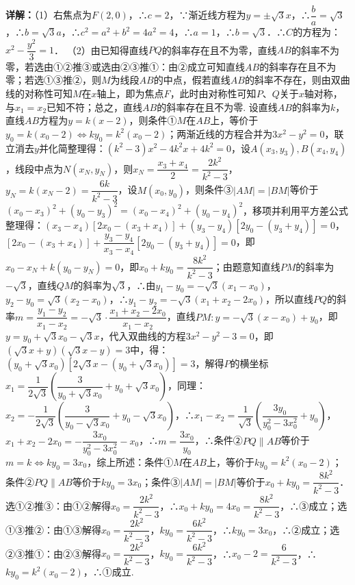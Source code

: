 \begin{question}[points=12]
\begin{solution}
\textbf{详解：}（1）右焦点为$F(2,0)$，∴$c=2$，∵渐近线方程为$y=\pm\sqrt{3}x$，∴$\dfrac{b}{a}=\sqrt{3}$，∴$b=\sqrt{3}a$，∴$c^2=a^2+b^2=4a^2=4$，∴$a=1$，∴$b=\sqrt{3}$．∴$C$的方程为：$x^2-\dfrac{y^2}{3}=1$．
（2）由已知得直线$PQ$的斜率存在且不为零，直线$AB$的斜率不为零，若选由①②推③或选由②③推①：由②成立可知直线$AB$的斜率存在且不为零；若选①③推②，则$M$为线段$AB$的中点，假若直线$AB$的斜率不存在，则由双曲线的对称性可知$M$在$x$轴上，即为焦点$F$，此时由对称性可知$P$、$Q$关于$x$轴对称，与$x_1=x_2$已知不符；总之，直线$AB$的斜率存在且不为零. 设直线$AB$的斜率为$k$，直线$AB$方程为$y=k(x-2)$，则条件①$M$在$AB$上，等价于$y_0=k(x_0-2)\Leftrightarrow ky_0=k^2(x_0-2)$；两渐近线的方程合并为$3x^2-y^2=0$，联立消去$y$并化简整理得：$(k^2-3)x^2-4k^2x+4k^2=0$，设$A(x_3,y_3),B(x_4,y_4)$，线段中点为$N(x_N,y_N)$，则$x_N=\dfrac{x_3+x_4}{2}=\dfrac{2k^2}{k^2-3}$，$y_N=k(x_N-2)=\dfrac{6k}{k^2-3}$，设$M(x_0,y_0)$，则条件③$|AM|=|BM|$等价于$(x_0-x_3)^2+(y_0-y_3)^2=(x_0-x_4)^2+(y_0-y_4)^2$，移项并利用平方差公式整理得：$(x_3-x_4)[2x_0-(x_3+x_4)]+(y_3-y_4)[2y_0-(y_3+y_4)]=0$，$[2x_0-(x_3+x_4)]+\dfrac{y_3-y_4}{x_3-x_4}[2y_0-(y_3+y_4)]=0$，即$x_0-x_N+k(y_0-y_N)=0$，即$x_0+ky_0=\dfrac{8k^2}{k^2-3}$；由题意知直线$PM$的斜率为$-\sqrt{3}$，直线$QM$的斜率为$\sqrt{3}$，∴由$y_1-y_0=-\sqrt{3}(x_1-x_0)$，$y_2-y_0=\sqrt{3}(x_2-x_0)$，∴$y_1-y_2=-\sqrt{3}(x_1+x_2-2x_0)$，所以直线$PQ$的斜率$m=\dfrac{y_1-y_2}{x_1-x_2}=-\sqrt{3}\cdot\dfrac{x_1+x_2-2x_0}{x_1-x_2}$，直线$PM: y=-\sqrt{3}(x-x_0)+y_0$，即$y=y_0+\sqrt{3}x_0-\sqrt{3}x$，代入双曲线的方程$3x^2-y^2-3=0$，即$(\sqrt{3}x+y)(\sqrt{3}x-y)=3$中，得：$(y_0+\sqrt{3}x_0)[2\sqrt{3}x-(y_0+\sqrt{3}x_0)]=3$，解得$P$的横坐标$x_1=\dfrac{1}{2\sqrt{3}}\left(\dfrac{3}{y_0+\sqrt{3}x_0}+y_0+\sqrt{3}x_0\right)$，同理：$x_2=-\dfrac{1}{2\sqrt{3}}\left(\dfrac{3}{y_0-\sqrt{3}x_0}+y_0-\sqrt{3}x_0\right)$，∴$x_1-x_2=\dfrac{1}{\sqrt{3}}\left(\dfrac{3y_0}{y_0^2-3x_0^2}+y_0\right)$，$x_1+x_2-2x_0=-\dfrac{3x_0}{y_0^2-3x_0^2}-x_0$，∴$m=\dfrac{3x_0}{y_0}$，∴条件②$PQ\parallel AB$等价于$m=k\Leftrightarrow ky_0=3x_0$，综上所述：条件①$M$在$AB$上，等价于$ky_0=k^2(x_0-2)$；条件②$PQ\parallel AB$等价于$ky_0=3x_0$；条件③$|AM|=|BM|$等价于$x_0+ky_0=\dfrac{8k^2}{k^2-3}$．选①②推③：由①②解得$x_0=\dfrac{2k^2}{k^2-3}$，∴$x_0+ky_0=4x_0=\dfrac{8k^2}{k^2-3}$，∴③成立；选①③推②：由①③解得$x_0=\dfrac{2k^2}{k^2-3}$，$ky_0=\dfrac{6k^2}{k^2-3}$，∴$ky_0=3x_0$，∴②成立；选②③推①：由②③解得$x_0=\dfrac{2k^2}{k^2-3}$，$ky_0=\dfrac{6k^2}{k^2-3}$，∴$x_0-2=\dfrac{6}{k^2-3}$，∴$ky_0=k^2(x_0-2)$，∴①成立.
\end{solution}
\end{question}

